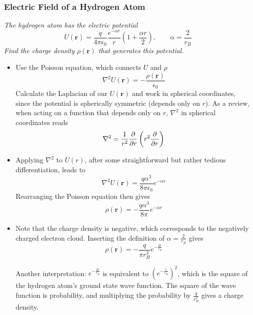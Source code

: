 \documentclass[11pt, a4paper]{article}
\renewcommand{\vec}[1]{\bm{#1}} %
\renewcommand{\r}{\vec{r}}
\begin{document}
\subsubsection{Electric Field of a Hydrogen Atom}
\textit{The hydrogen atom has the electric potential}
\begin{equation*}
	U(\r) = \frac{q}{4\pi \epsilon_{0}} \frac{e^{-\alpha r}}{r}\left(1 + \frac{\alpha r}{2}\right), \qquad \alpha = \frac{2}{r_{B}}
\end{equation*}
\textit{Find the charge density $ \rho(\r) $ that generates this potential.}
\begin{itemize}
	\item Use the Poisson equation, which connects $ U $ and $ \rho $
	\begin{equation*}
		\nabla^{2}U(\r) = - \frac{\rho(\r)}{\epsilon_{0}}
	\end{equation*}
	Calculate the Laplacian of our $ U(\r) $ and work in spherical coordinates, since the potential is spherically symmetric (depends only on $ r $). As a review, when acting on a function that depends only on $ r $, $ \nabla^{2} $ in spherical coordinates reads
	\begin{equation*}
		\nabla^{2} = \frac{1}{r^{2}} \pdv{}{r}\left(r^{2} \pdv{}{r}\right)
	\end{equation*}
	
	\item Applying $ \nabla^{2} $ to $ U(r) $, after some straightforward but rather tedious differentiation, leads to
	\begin{equation*}
		\nabla^{2}U(\r) = \frac{q\alpha^{3}}{8 \pi \epsilon_{0}}e^{-\alpha r}
	\end{equation*}
	Rearranging the Poisson equation then gives
	\begin{equation*}
		\rho(\r) = - \frac{q\alpha^{3}}{8 \pi}e^{-\alpha r}
	\end{equation*}
	
	\item Note that the charge density is negative, which corresponds to the negatively charged electron cloud. Inserting the definition of $ \alpha = \frac{2}{r_{B}}$ gives
	\begin{equation*}
		\rho(\r) = -\frac{q}{\pi r_{B}^{3}} e^{-\frac{2r}{r_{B}}}
	\end{equation*}
	
	Another interpretation: $ e^{-\frac{2r}{r_{B}}} $ is equivalent to $ \left(e^{-\frac{r}{r_{B}}}\right)^{2} $, which is the square of the hydrogen atom's ground state wave function. The square of the wave function is probability, and multiplying the probability by $ \frac{q}{r_{B}^{3}} $ gives a charge density. 
	

\end{itemize}
\end{document}
